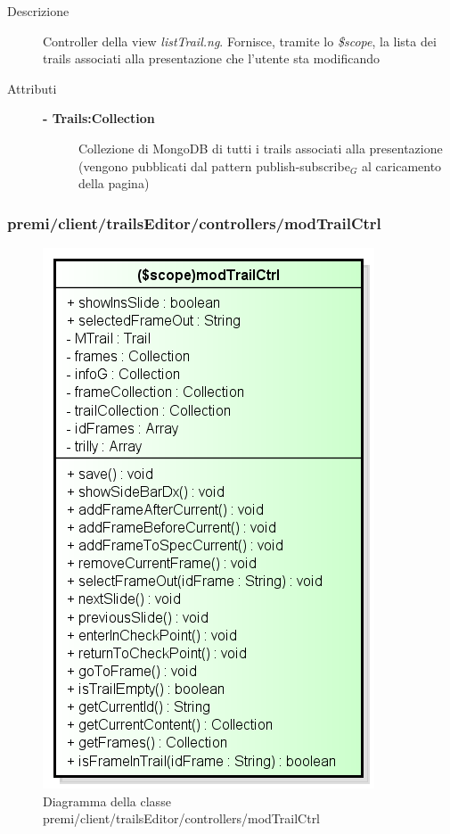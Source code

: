 \begin{description}
\item[Descrizione] \hfill
	Controller della view \textit{listTrail.ng}. Fornisce, tramite lo \textit{\$scope}, la lista dei trails associati alla presentazione che l'utente sta modificando
	
	
\item[Attributi] \hfill
	\begin{description}
		\item[\textbf{- Trails:Collection			}] \hfill
			Collezione di MongoDB di tutti i trails associati alla presentazione (vengono pubblicati dal pattern publish-subscribe$_G$ al caricamento della pagina)	
	\end{description}
\end{description}








\subsubsection{premi/client/trailsEditor/controllers/modTrailCtrl}
\begin{figure}[h]
\begin{center}
\includegraphics[scale=0.55]{img/diacla/modTrailCtrl.png}
\caption{Diagramma della classe premi/client/trailsEditor/controllers/modTrailCtrl}
\end{center}
\end{figure}


